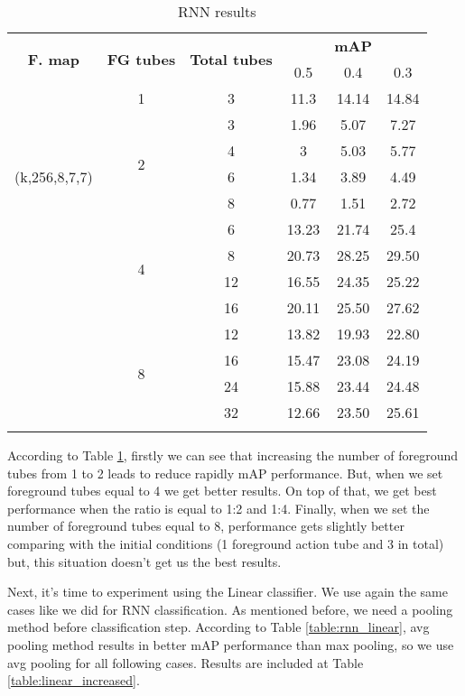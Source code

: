 \begin{center}
  \begin{longtable}{|| c | c | c || c c c||}
    \hline
    \multirow{2}{*}{\textbf{F. map}} & \multirow{2}{*}{\textbf{FG tubes}}  & \multirow{2}{*}{\textbf{Total tubes}} & {} & \textbf{mAP} & {} \\
    {}  & {} & {} & 0.5 & 0.4 & 0.3 \\
    \hline
    \multirow{7}{*}{(k,256,8,7,7)} & 1 & 3 & 11.3 & 14.14 & 14.84 \\
    \cline{2-6}
    {} & \multirow{4}{*}{2} & 3 & 1.96 & 5.07 & 7.27 \\
    \cline{3-6}
    {} & {} & 4  & 3 & 5.03 & 5.77 \\
    \cline{3-6}
    {} & {} & 6 & 1.34 & 3.89 & 4.49 \\
    \cline{3-6}
    {} & {} & 8 & 0.77 & 1.51 & 2.72 \\
    \cline{2-6}
    {} & \multirow{4}{*}{4} &  6 & 13.23 & 21.74 & 25.4 \\
    \cline{3-6}
    {} & {} & 8 & 20.73 & 28.25 & 29.50 \\
    \cline{3-6}
    {} & {} & 12  & 16.55 & 24.35 & 25.22 \\
    \cline{3-6}
    {} & {} & 16  & 20.11 & 25.50 & 27.62 \\
    \cline{2-6}
    {} & \multirow{4}{*}{8} & 12 & 13.82 & 19.93 & 22.80 \\
    \cline{3-6}
    {} &  {} & 16 & 15.47 & 23.08 & 24.19 \\
    \cline{3-6}
    {} &  {} & 24 & 15.88 & 23.44 & 24.48  \\
    \cline{3-6}
    {} &  {} & 32 &  12.66 & 23.50 & 25.61 \\
    \hline

  \caption{RNN results }
  \label{table:rnn_increased}
\end{longtable}
\end{center}

According to Table \ref{table:rnn_increased}, firstly we can see that increasing the number of foreground tubes from 1 to 2 leads to reduce
rapidly mAP performance. But, when we set foreground tubes equal to 4 we get better results. On top of that, we get best performance when
the ratio is equal to 1:2 and 1:4. Finally, when we set the number of foreground tubes equal to 8, performance gets slightly better
comparing with the initial conditions (1 foreground action tube and 3 in total) but, this situation doesn't get us the best results. \par 
Next, it's time to experiment using the Linear classifier. We use again the same cases like we did for RNN classification. As mentioned
before, we need a pooling method before classification step. According to Table \ref{table:rnn_linear}, avg pooling method results in
better mAP performance than max pooling, so we use avg pooling for all following cases. Results are included at Table \ref{table:linear_increased}.

